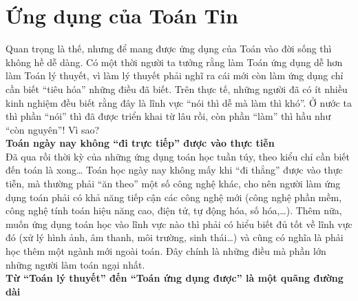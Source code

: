 \documentclass[12pt,a4paper]{report}
\begin{document}
    \section{Ứng dụng của Toán Tin}
    Quan trọng là thế, nhưng để mang được ứng dụng của Toán vào đời sống thì không hề dễ dàng. Có một thời người ta tưởng rằng làm Toán ứng dụng dễ hơn làm Toán lý thuyết, vì làm lý  thuyết phải nghĩ ra cái mới còn làm ứng dụng chỉ cần biết “tiêu hóa” những điều  đã biết. Trên thực tế, những người đã có ít nhiều kinh nghiệm đều biết rằng đây là lĩnh vực “nói thì dễ mà làm thì khó”. Ở nước ta thì phần “nói” thì đã được triển khai từ lâu rồi, còn phần “làm” thì hầu như “còn nguyên”! Vì sao?\\
    \textbf{Toán ngày nay không “đi trực tiếp”  được vào thực tiễn}\\
    Đã qua rồi thời kỳ của những ứng dụng toán học tuần túy, theo kiểu chỉ cần biết đến toán là xong… Toán học ngày nay không mấy khi “đi thẳng” được vào thực tiễn, mà thường phải “ăn theo” một số công nghệ khác, cho nên người làm ứng dụng toán phải có khả năng tiếp cận các công nghệ mới (công nghệ phần mềm, công nghệ tính toán hiệu năng cao, điện tử, tự động hóa, số hóa,…). Thêm nữa, muốn ứng dụng toán học vào lĩnh vực nào thì phải có hiểu biết đủ tốt về lĩnh vực đó (xử lý hình ảnh, âm thanh, môi trường, sinh thái…) và cũng có nghĩa là phải học thêm một ngành mới ngoài toán. Đây chính là những điều mà phần lớn những người làm toán ngại nhất.\\
    \textbf{Từ  “Toán lý thuyết” đến “Toán ứng dụng được” là một quãng đường dài}\\
\end{document}
